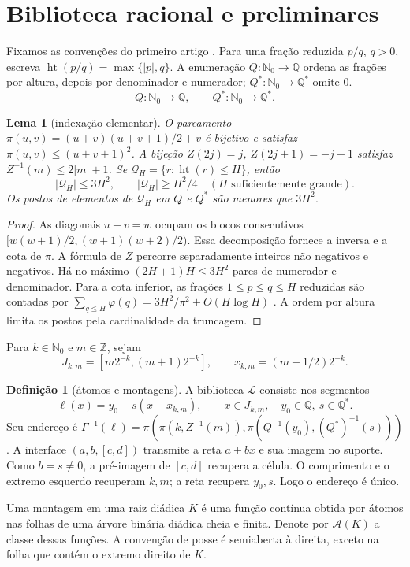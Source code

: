 \documentclass[11pt,a4paper]{article}
\newtheorem{lemma}[theorem]{Lema}
\theoremstyle{definition}
\newtheorem{definition}[theorem]{Definição}
\theoremstyle{remark}
\newcommand{\Nzero}{\mathbb{N}_0}
\newcommand{\Qstar}{\mathbb{Q}^{\!*}}
\newcommand{\Aclass}{\mathcal{A}}
\newcommand{\Library}{\mathcal{L}}
\newcommand{\height}{\operatorname{ht}}
\begin{document}
\section{Biblioteca racional e preliminares}
\label{sec:indexing}\label{sec:generator}\label{sec:assemblies}
Fixamos as convenções do primeiro artigo \citep{oliveiraI}. Para uma fração reduzida $p/q$, $q>0$, escreva $\height(p/q)=\max\{|p|,q\}$. A enumeração $Q:\Nzero\to\mathbb Q$ ordena as frações por altura, depois por denominador e numerador; $Q^*:\Nzero\to\Qstar$ omite $0$.
\begin{equation}
 Q:\Nzero\longrightarrow\mathbb Q,\qquad Q^*:\Nzero\longrightarrow\Qstar.
 \label{eq:q-enums}
\end{equation}
\begin{lemma}[indexação elementar]
\label{lem:cantor}\label{lem:integers}\label{lem:rational-count}\label{lem:rational-rank}
O pareamento $\pi(u,v)=(u+v)(u+v+1)/2+v$ é bijetivo e satisfaz $\pi(u,v)\le(u+v+1)^2$. A bijeção $Z(2j)=j$, $Z(2j+1)=-j-1$ satisfaz $Z^{-1}(m)\le2|m|+1$. Se $\mathcal Q_H=\{r:\height(r)\le H\}$, então
\[
 |\mathcal Q_H|\le3H^2,\qquad |\mathcal Q_H|\ge H^2/4\quad(H\text{ suficientemente grande}).
\]
Os postos de elementos de $\mathcal Q_H$ em $Q$ e $Q^*$ são menores que $3H^2$.
\end{lemma}
\begin{proof}
As diagonais $u+v=w$ ocupam os blocos consecutivos $[w(w+1)/2,(w+1)(w+2)/2)$. Essa decomposição fornece a inversa e a cota de $\pi$. A fórmula de $Z$ percorre separadamente inteiros não negativos e negativos. Há no máximo $(2H+1)H\le3H^2$ pares de numerador e denominador. Para a cota inferior, as frações $1\le p\le q\le H$ reduzidas são contadas por $\sum_{q\le H}\varphi(q)=3H^2/\pi^2+O(H\log H)$ \citep{hardywright2008}. A ordem por altura limita os postos pela cardinalidade da truncagem.
\end{proof}

Para $k\in\Nzero$ e $m\in\mathbb Z$, sejam
\[
 J_{k,m}=[m2^{-k},(m+1)2^{-k}],\qquad x_{k,m}=(m+1/2)2^{-k}.
\]
\begin{definition}[átomos e montagens]\label{def:assembly}\label{thm:dictionary}\label{lem:cell-recovery}
A biblioteca $\Library$ consiste nos segmentos
\[
 \ell(x)=y_0+s(x-x_{k,m}),\qquad x\in J_{k,m},\quad y_0\in\mathbb Q,\ s\in\Qstar.
\]
Seu endereço é $\Gamma^{-1}(\ell)=\pi(\pi(k,Z^{-1}(m)),\pi(Q^{-1}(y_0),(Q^*)^{-1}(s)))$. A interface $(a,b,[c,d])$ transmite a reta $a+bx$ e sua imagem no suporte. Como $b=s\ne0$, a pré-imagem de $[c,d]$ recupera a célula. O comprimento e o extremo esquerdo recuperam $k,m$; a reta recupera $y_0,s$. Logo o endereço é único.

Uma montagem em uma raiz diádica $K$ é uma função contínua obtida por átomos nas folhas de uma árvore binária diádica cheia e finita. Denote por $\Aclass(K)$ a classe dessas funções. A convenção de posse é semiaberta à direita, exceto na folha que contém o extremo direito de $K$.
\end{definition}
\end{document}

